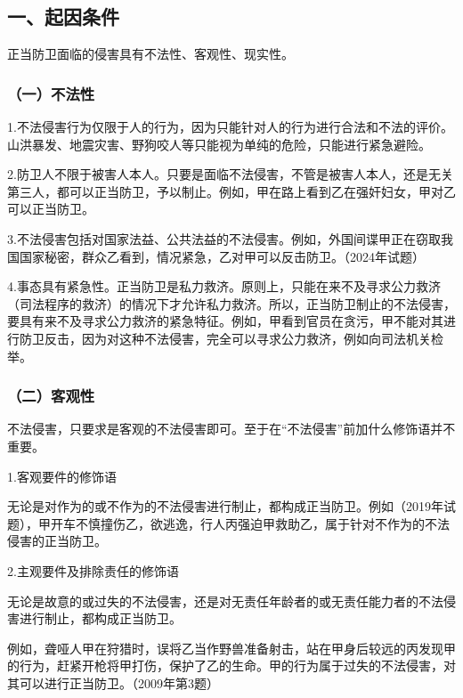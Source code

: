 \subsection*{一、起因条件}

正当防卫面临的侵害具有不法性、客观性、现实性。

\subsubsection*{（一）不法性}

1.不法侵害行为仅限于人的行为，因为只能针对人的行为进行合法和不法的评价。山洪暴发、地震灾害、野狗咬人等只能视为单纯的危险，只能进行紧急避险。

2.防卫人不限于被害人本人。只要是面临不法侵害，不管是被害人本人，还是无关第三人，都可以正当防卫，予以制止。例如，甲在路上看到乙在强奸妇女，甲对乙可以正当防卫。

3.不法侵害包括对国家法益、公共法益的不法侵害。例如，外国间谍甲正在窃取我国国家秘密，群众乙看到，情况紧急，乙对甲可以反击防卫。（2024年试题）

4.事态具有紧急性。正当防卫是私力救济。原则上，只能在来不及寻求公力救济（司法程序的救济）的情况下才允许私力救济。所以，正当防卫制止的不法侵害，要具有来不及寻求公力救济的紧急特征。例如，甲看到官员在贪污，甲不能对其进行防卫反击，因为对这种不法侵害，完全可以寻求公力救济，例如向司法机关检举。

\subsubsection*{（二）客观性}

不法侵害，只要求是客观的不法侵害即可。至于在“不法侵害”前加什么修饰语并不重要。

1.客观要件的修饰语

无论是对作为的或不作为的不法侵害进行制止，都构成正当防卫。例如（2019年试题），甲开车不慎撞伤乙，欲逃逸，行人丙强迫甲救助乙，属于针对不作为的不法侵害的正当防卫。

2.主观要件及排除责任的修饰语

无论是故意的或过失的不法侵害，还是对无责任年龄者的或无责任能力者的不法侵害进行制止，都构成正当防卫。


例如，聋哑人甲在狩猎时，误将乙当作野兽准备射击，站在甲身后较远的丙发现甲的行为，赶紧开枪将甲打伤，保护了乙的生命。甲的行为属于过失的不法侵害，对其可以进行正当防卫。（2009年第3题）

